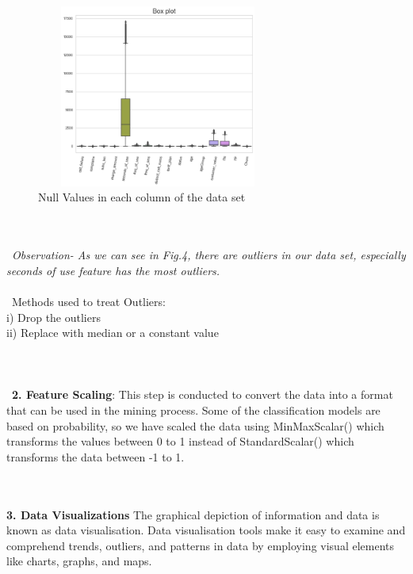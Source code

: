 \documentclass[a4paper, 10pt, conference]{ieeeconf}      %
\begin{document}
\begin{figure}[htp]
    \centering
    \includegraphics[width=8cm,height=6cm]{Images/boxplot.png}
    \caption{Null Values in each column of the data set}
    \label{fig:boxplot}
\end{figure}
\\\
\\\
\textit{Observation- As we can see in Fig.4, there are outliers in our data set, especially seconds of use feature has the most outliers.}
\\\
\\\
Methods used to treat Outliers:
\\i) Drop the outliers
\\ii) Replace with median or a constant value
\\\
\\\
\\
\\\
\textbf{2. Feature Scaling}: This step is conducted to convert the data into a format that can be used in the mining process. Some of the classification models are based on probability, so we have scaled the data using MinMaxScalar() which transforms the values between 0 to 1 instead of StandardScalar() which transforms the data between -1 to 1.
 

 
\\\
\\\textbf{3. Data Visualizations}
The graphical depiction of information and data is known as data visualisation. Data visualisation tools make it easy to examine and comprehend trends, outliers, and patterns in data by employing visual elements like charts, graphs, and maps.
\end{document}
